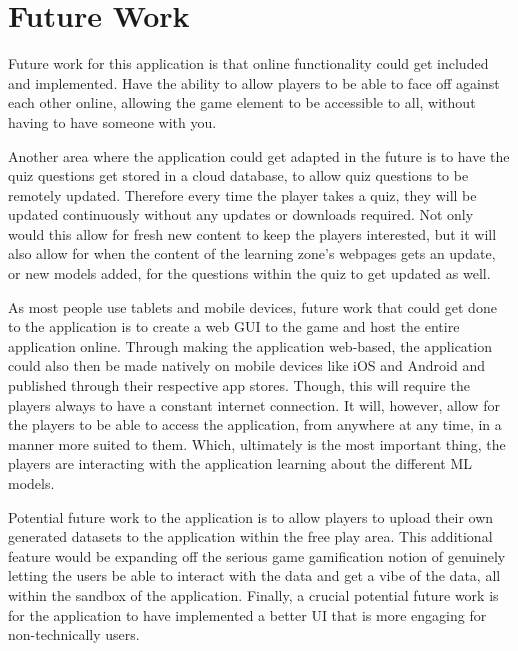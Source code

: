 	\section{Future Work} %
		Future work for this application is that online functionality could get included and implemented. Have the ability to allow players to be able to face off against each other online, allowing the game element to be accessible to all, without having to have someone with you.
		
		Another area where the application could get adapted in the future is to have the quiz questions get stored in a cloud database, to allow quiz questions to be remotely updated. Therefore every time the player takes a quiz, they will be updated continuously without any updates or downloads required. Not only would this allow for fresh new content to keep the players interested, but it will also allow for when the content of the learning zone's webpages gets an update, or new models added, for the questions within the quiz to get updated as well.
		
		As most people use tablets and mobile devices, future work that could get done to the application is to create a web GUI to the game and host the entire application online. Through making the application web-based, the application could also then be made natively on mobile devices like iOS and Android and published through their respective app stores. Though, this will require the players always to have a constant internet connection. It will, however, allow for the players to be able to access the application, from anywhere at any time, in a manner more suited to them. Which, ultimately is the most important thing, the players are interacting with the application learning about the different ML models.
		
		Potential future work to the application is to allow players to upload their own generated datasets to the application within the free play area. This additional feature would be expanding off the serious game gamification notion of genuinely letting the users be able to interact with the data and get a vibe of the data, all within the sandbox of the application. Finally, a crucial potential future work is for the application to have implemented a better UI that is more engaging for non-technically users. 

